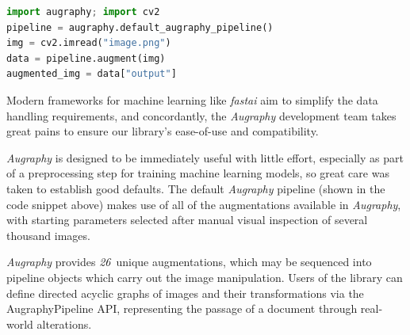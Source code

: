 \documentclass[runningheads]{llncs}
\newcommand{\numAugraphyAugmentations}{\emph{26}}
\begin{document}
\begin{lstlisting}[language=Python, label={lst:sample-code}, caption={Augmenting a document image with \emph{Augraphy}.}]
import augraphy; import cv2
pipeline = augraphy.default_augraphy_pipeline()
img = cv2.imread("image.png")
data = pipeline.augment(img)
augmented_img = data["output"]
\end{lstlisting}

Modern frameworks for machine learning like \emph{fastai} \cite{ref_fastai} aim to simplify the data handling requirements, and concordantly, the \emph{Augraphy} development team takes great pains to ensure our library's ease-of-use and compatibility.

\emph{Augraphy} is designed to be immediately useful with little effort, especially as part of a preprocessing step for training machine learning models, so great care was taken to establish good defaults.
The default \emph{Augraphy} pipeline (shown in the code snippet above) makes use of all of the augmentations available in \emph{Augraphy}, with starting parameters selected after manual visual inspection of several thousand images.

\emph{Augraphy} provides \numAugraphyAugmentations ~unique augmentations, which may be sequenced into pipeline objects which carry out the image manipulation.
Users of the library can define directed acyclic graphs of images and their transformations via the AugraphyPipeline API, representing the passage of a document through real-world alterations.
\end{document}
